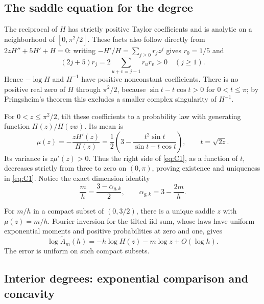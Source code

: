 \subsection{The saddle equation for the degree}\label{the-positive-saddle-and-its-effective-density}

The reciprocal of \(H\) has strictly positive Taylor coefficients and is
analytic on a neighborhood of \([0,\pi^2/2]\). These facts also follow
directly from \(2zH''+5H'+H=0\): writing \(-H'/H=\sum_{j\ge0}r_jz^j\)
gives \(r_0=1/5\) and \[
 (2j+5)r_j=2\sum_{u+v=j-1}r_ur_v>0\quad(j\ge1).
\] Hence \(-\log H\) and \(H^{-1}\) have positive nonconstant
coefficients. There is no positive real zero of \(H\) through
\(\pi^2/2\), because \(\sin t-t\cos t>0\) for \(0<t\le\pi\); by
Pringsheim's theorem this excludes a smaller complex singularity of
\(H^{-1}\).

For \(0<z\le\pi^2/2\), tilt these coefficients to a probability law with
generating function \(H(z)/H(zw)\). Its mean is \begin{equation}
\mu(z)=-\frac{zH'(z)}{H(z)}
 =\frac12\left(3-
     \frac{t^2\sin t}{\sin t-t\cos t}\right),
 \qquad t=\sqrt{2z}.
 \label{eq:C10}
\end{equation} Its variance is \(z\mu'(z)>0\). Thus the right side of \eqref{eq:C1}, as a
function of \(t\), decreases strictly from three to zero on \((0,\pi)\),
proving existence and uniqueness in \eqref{eq:C1}. Notice the exact dimension
identity \begin{equation}
\frac mh=\frac{3-\alpha_{g,k}}2,
 \qquad \alpha_{g,k}=3-\frac{2m}{h}.
 \label{eq:C11}
\end{equation}

For \(m/h\) in a compact subset of \((0,3/2)\), there is a unique saddle
\(z\) with \(\mu(z)=m/h\). Fourier inversion for the tilted iid sum,
whose laws have uniform exponential moments and positive probabilities
at zero and one, gives \begin{equation}
\log \widetilde A_m(h)=-h\log H(z)-m\log z+O(\log h).
 \label{eq:C12}
\end{equation} The error is uniform on such compact subsets.

\subsection{Interior degrees: exponential comparison and concavity}\label{interior-degrees-exponential-comparison-plus-concavity}

